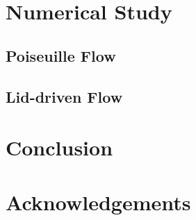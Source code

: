 \documentclass{article}
\begin{document}
\section{Numerical Study}

\subsection{Poiseuille Flow}

\subsection{Lid-driven Flow}

\section{Conclusion}

\section*{Acknowledgements}



	
\end{document}
